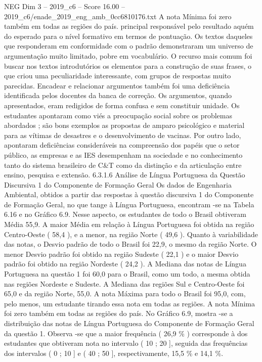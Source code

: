 \begin{textsample}{NEG Dim 3 – 2019\_c6 – Score 16.00 – 2019\_c6/enade\_2019\_eng\_amb\_0cc6810176.txt}
A nota Mínima foi zero também em todas as regiões do país. principal responsável pelo resultado aquém do esperado para o nível formativo em termos de pontuação.
Os textos daqueles que responderam em conformidade com o padrão demonstraram um universo de argumentação muito limitado, pobre em vocabulário.
O recurso mais comum foi buscar nos textos introdutórios os elementos para a construção de suas frases, o que criou uma peculiaridade interessante, com grupos de respostas muito parecidas.
Encadear e relacionar argumentos também foi uma deficiência identificada pelos docentes da banca de correção.
Os argumentos, quando apresentados, eram redigidos de forma confusa e sem constituir unidade.
Os estudantes apontaram como viés a preocupação social sobre os problemas abordados ; são bons exemplos as propostas de amparo psicológico e material para as vítimas de desastres e o desenvolvimento de vacinas.
Por outro lado, apontaram deficiências consideráveis na compreensão dos papéis que o setor público, as empresas e as IES desempenham na sociedade e no conhecimento tanto do sistema brasileiro de C\&T como da distinção e da articulação entre ensino, pesquisa e extensão. 6.3.1.6 Análise de Língua Portuguesa da Questão Discursiva 1 do Componente de Formação Geral Os dados de Engenharia Ambiental, obtidos a partir das respostas à questão discursiva 1 do Componente de Formação Geral, no que tange à Língua Portuguesa, encontram -se na Tabela 6.16 e no Gráfico 6.9.
Nesse aspecto, os estudantes de todo o Brasil obtiveram Média 55,9.
A maior Média em relação à Língua Portuguesa foi obtida na região Centro-Oeste ( 58,4 ), e a menor, na região Norte ( 49,6 ).
Quanto à variabilidade das notas, o Desvio padrão de todo o Brasil foi 22,9, o mesmo da região Norte.
O menor Desvio padrão foi obtido na região Sudeste ( 22,1 ) e o maior Desvio padrão foi obtido na região Nordeste ( 24,2 ).
A Mediana das notas de Língua Portuguesa na questão 1 foi 60,0 para o Brasil, como um todo, a mesma obtida nas regiões Nordeste e Sudeste.
A Mediana das regiões Sul e Centro-Oeste foi 65,0 e da região Norte, 55,0.
A nota Máxima para todo o Brasil foi 95,0, com, pelo menos, um estudante tirando essa nota em todas as regiões.
A nota Mínima foi zero também em todas as regiões do país.
No Gráfico 6.9, mostra -se a distribuição das notas de Língua Portuguesa do Componente de Formação Geral da questão 1.
Observa -se que a maior frequência ( 26,9 \% ) corresponde à dos estudantes que obtiveram nota no intervalo ( 10 ; 20 ], seguida das frequências dos intervalos ( 0 ; 10 ] e ( 40 ; 50 ], respectivamente, 15,5 \% e 14,1 \%.

\end{textsample}

